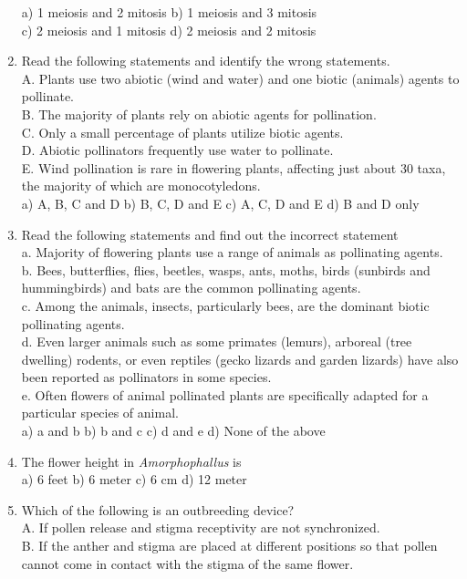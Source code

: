 \begin{enumerate}
  a) 1 meiosis and 2 mitosis b) 1 meiosis and 3 mitosis\\
  c) 2 meiosis and 1 mitosis d) 2 meiosis and 2 mitosis
\item
  Read the following statements and identify the wrong statements.\\
  A. Plants use two abiotic (wind and water) and one biotic (animals)
  agents to pollinate.\\
  B. The majority of plants rely on abiotic agents for pollination.\\
  C. Only a small percentage of plants utilize biotic agents.\\
  D. Abiotic pollinators frequently use water to pollinate.\\
  E. Wind pollination is rare in flowering plants, affecting just about
  30 taxa, the majority of which are monocotyledons.\\
  a) A, B, C and D b) B, C, D and E c) A, C, D and E d) B and D only
\item
  Read the following statements and find out the incorrect statement\\
  a. Majority of flowering plants use a range of animals as pollinating
  agents.\\
  b. Bees, butterflies, flies, beetles, wasps, ants, moths, birds
  (sunbirds and hummingbirds) and bats are the common pollinating
  agents.\\
  c. Among the animals, insects, particularly bees, are the dominant
  biotic pollinating agents.\\
  d. Even larger animals such as some primates (lemurs), arboreal (tree
  dwelling) rodents, or even reptiles (gecko lizards and garden lizards)
  have also been reported as pollinators in some species.\\
  e. Often flowers of animal pollinated plants are specifically adapted
  for a particular species of animal.\\
  a) a and b b) b and c c) d and e d) None of the above
\item
  The flower height in \emph{Amorphophallus} is\\
  a) 6 feet b) 6 meter c) 6 cm d) 12 meter
\item
  Which of the following is an outbreeding device?\\
  A. If pollen release and stigma receptivity are not synchronized.\\
  B. If the anther and stigma are placed at different positions so that
  pollen cannot come in contact with the stigma of the same flower.\\

\end{enumerate}
